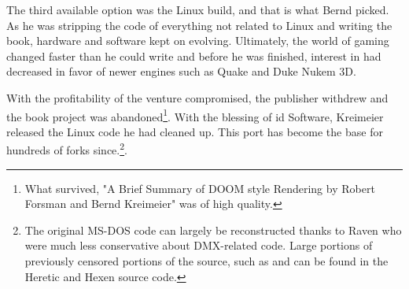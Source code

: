     The third available option was the Linux build, and that is what Bernd picked. As he was stripping the code of everything not related to Linux and writing the book, hardware and software kept on evolving. Ultimately, the world of gaming changed faster than he could write and before he was finished, interest in \doom{} had decreased in favor of newer engines such as Quake and Duke Nukem 3D.\\
 \par
  With the profitability of the venture compromised, the publisher withdrew and the book project was abandoned\footnote{What survived, "A Brief Summary of DOOM style Rendering by Robert Forsman and Bernd Kreimeier" was of high quality.}. With the blessing of id Software, Kreimeier released the Linux code he had cleaned up. This port has become the base for hundreds of forks since.\footnote{The original MS-DOS code can largely be reconstructed thanks to Raven who were much less conservative about DMX-related code. Large portions of previously censored portions of the source, such as  and  can be found in the Heretic and Hexen source code.}.\\
 \par  


